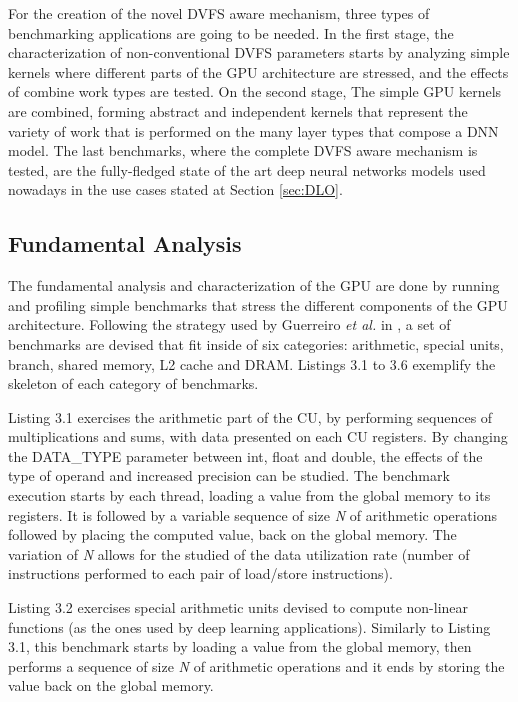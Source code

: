 For the creation of the novel DVFS aware mechanism, three types of benchmarking applications are going to be needed. In the first stage, the characterization of non-conventional DVFS parameters starts by analyzing simple kernels where different parts of the GPU architecture are stressed, and the effects of combine work types are tested. On the second stage, The simple GPU kernels are combined, forming abstract and independent kernels that represent the variety of work that is performed on the many layer types that compose a DNN model. The last benchmarks, where the complete DVFS aware mechanism is tested, are the fully-fledged state of the art deep neural networks models used nowadays in the use cases stated at Section \ref{sec:DLO}.

\subsection{Fundamental Analysis}

The fundamental analysis and characterization of the GPU are done by running and profiling simple benchmarks that stress the different components of the GPU architecture. Following the strategy used by Guerreiro \textit{et al.} in \cite{guerreiro_gpgpu_2018} \cite{guerreiro_modeling_2019}, a set of benchmarks are devised that fit inside of six categories: arithmetic, special units, branch, shared memory, L2 cache and DRAM.  Listings 3.1 to 3.6 exemplify the skeleton of each category of benchmarks.

Listing 3.1 exercises the arithmetic part of the CU, by performing sequences of multiplications and sums, with data presented on each CU registers. By changing the DATA\_TYPE parameter between int,  float and double, the effects of the type of operand and increased precision can be studied. The benchmark execution starts by each thread, loading a value from the global memory to its registers. It is followed by a variable sequence of size \textit{N} of arithmetic operations followed by placing the computed value, back on the global memory. The variation of \textit{N} allows for the studied of the data utilization rate (number of instructions performed to each pair of load/store instructions).


Listing 3.2 exercises special arithmetic units devised to compute non-linear functions (as the ones used by deep learning applications). Similarly to Listing 3.1, this benchmark starts by loading a value from the global memory, then performs a sequence of size \textit{N} of arithmetic operations and it ends by storing the value back on the global memory.


